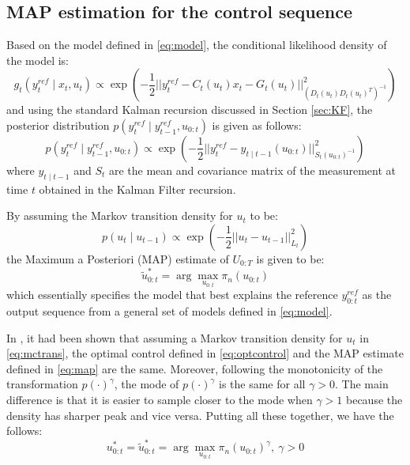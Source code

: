 \subsection{MAP estimation for the control sequence}
Based on the model defined in \eqref{eq:model}, the conditional likelihood density of the model is:
\begin{equation}
  g_t(y^{ref}_t \mid x_t, u_t) \propto \exp\left( -\dfrac{1}{2} \vert\vert y^{ref}_t - C_t(u_t)x_t - G_t(u_t) \vert\vert^2_{(D_t(u_t)D_t(u_t)^T)^{-1}}\right)
\end{equation}
and using the standard Kalman recursion discussed in Section \ref{sec:KF}, the posterior distribution $p(y^{ref}_t \mid y^{ref}_{t-1}, u_{0:t})$ is given as follows:
\begin{equation}
  p(y^{ref}_t \mid y^{ref}_{t-1}, u_{0:t}) \propto \exp\left( -\dfrac{1}{2} \vert\vert y^{ref}_t - y_{t \mid t-1}(u_{0:t}) \vert\vert^2_{S_t(u_{0:t})^{-1}}\right)
\end{equation}
where $y_{t \mid t-1}$ and $S_t$ are the mean and covariance matrix of the measurement at time $t$ obtained in the Kalman Filter recursion.

By assuming the Markov transition density for $u_t$ to be:
\begin{equation}
  p(u_{t} \mid u_{t-1}) \propto  \exp\left( -\dfrac{1}{2} \vert\vert u_t - u_{t-1} \vert\vert^2_{L_t}\right)
\label{eq:mctrans}
\end{equation}
the Maximum a Posteriori (MAP) estimate of $U_{0:T}$ is given to be:
\begin{equation}
  \tilde{u}^*_{0:t} = \arg\max_{u_{0:t}} \pi_n(u_{0:t})
\label{eq:map}
\end{equation}
which essentially specifies the model that best explains the reference $y^{ref}_{0:t}$ as the output sequence from a general set of models defined in \eqref{eq:model}.

In \cite{NK11}, it had been shown that assuming a Markov transition density for $u_t$ in \eqref{eq:mctrans}, the optimal control defined in \eqref{eq:optcontrol} and the MAP estimate defined in \eqref{eq:map} are the same. Moreover, following the monotonicity of the transformation $p(\cdot)^\gamma$, the mode of $p(\cdot)^\gamma$ is the same for all $\gamma > 0$. The main difference is that it is easier to sample closer to the mode when $\gamma > 1$ because the density has sharper peak and vice versa. Putting all these together, we have the follows:
\begin{equation}
  u^*_{0:t} = \tilde{u}^*_{0:t} = \arg\max_{u_{0:t}} \pi_n(u_{0:t})^\gamma,~\gamma > 0
\end{equation}

